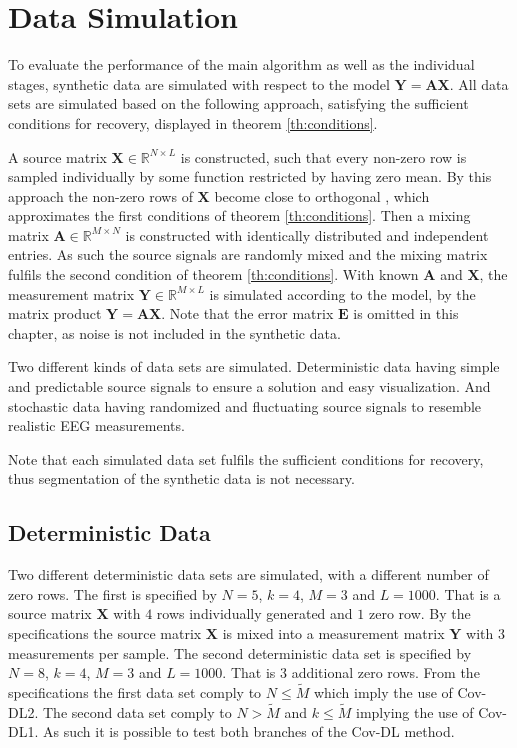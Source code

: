 \section{Data Simulation}\label{sec:dataset}
To evaluate the performance of the main algorithm as well as the individual stages, synthetic data are simulated with respect to the model $\mathbf{Y} = \mathbf{A}\mathbf{X}$. All data sets are simulated based on the following approach, satisfying the sufficient conditions for recovery, displayed in theorem \ref{th:conditions}.
 
A source matrix $\mathbf{X} \in \mathbb{R}^{N \times L}$ is constructed, such that every non-zero row is sampled individually by some function restricted by having zero mean. By this approach the non-zero rows of $\mathbf{X}$ become close to orthogonal \cite{Balkan2014}, which approximates the first conditions of theorem \ref{th:conditions}.   
Then a mixing matrix $\mathbf{A} \in \mathbb{R}^{M \times N}$ is constructed with identically distributed and independent entries. 
As such the source signals are randomly mixed and the mixing matrix fulfils the second condition of theorem \ref{th:conditions}.
With known $\mathbf{A}$ and $\mathbf{X}$, the measurement matrix $\mathbf{Y} \in \mathbb{R}^{M \times L}$ is simulated according to the model, by the matrix product $\mathbf{Y} = \mathbf{AX}$. Note that the error matrix $\mathbf{E}$ is omitted in this chapter, as noise is not included in the synthetic data.  

Two different kinds of data sets are simulated.
Deterministic data having simple and predictable source signals to ensure a solution and easy visualization.
And stochastic data having randomized and fluctuating source signals to resemble realistic EEG measurements.

Note that each simulated data set fulfils the sufficient conditions for recovery, thus segmentation of the synthetic data is not necessary. 

\subsection{Deterministic Data}\label{subseg_simpledata}
Two different deterministic data sets are simulated, with a different number of zero rows. 
The first is specified by $N = 5$, $k = 4$, $M = 3$ and $L = 1000$. 
That is a source matrix $\mathbf{X}$ with $4$ rows individually generated and $1$ zero row. By the specifications the source matrix $\mathbf{X}$ is mixed into a measurement matrix $\mathbf{Y}$ with $3$ measurements per sample.  
The second deterministic data set is specified by $N = 8$, $k = 4$, $M = 3$ and $L = 1000$. 
That is 3 additional zero rows.
From the specifications the first data set comply to $N \leq \widetilde{M}$ which imply the use of Cov-DL2.
The second data set comply to $N > \widetilde{M}$ and $k \leq \widetilde{M}$ implying the use of Cov-DL1. 
As such it is possible to test both branches of the Cov-DL method. 
     
